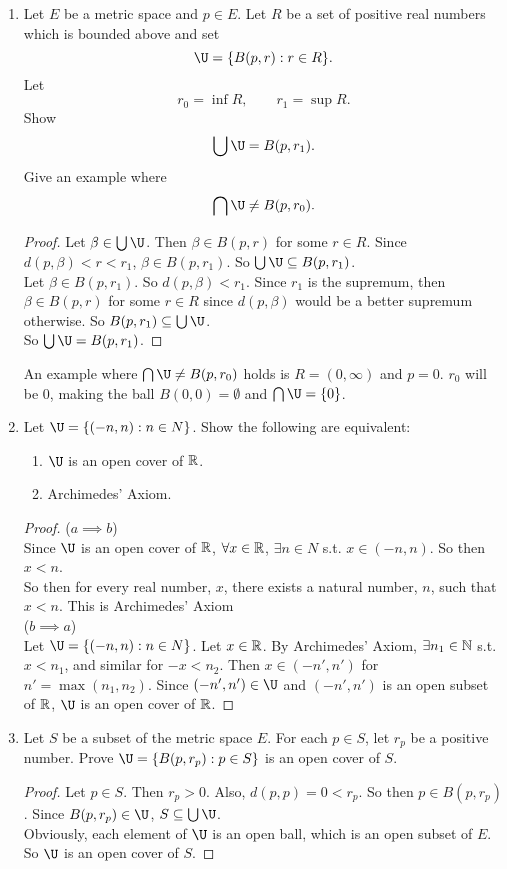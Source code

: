 \documentclass[14pt]{extarticle}
\begin{document}
\begin{enumerate}
		\item Let $E$ be a metric space and $p \in E$. Let $R$ be a set of positive real numbers which is bounded above and set $$\U = \{B(p, r) : r \in R\}.$$
		Let $$r_0 = \inf R, \qquad r_1 = \sup R.$$
		Show $$\bigcup \U = B(p,r_1).$$
		Give an example where $$\bigcap \U \neq B(p,r_0).$$
		\begin{proof}
			Let $\beta \in \bigcup\U$. Then $\beta \in B(p,r)$ for some $r\in R$. Since $d(p,\beta) < r < r_1$, $\beta \in B(p,r_1)$. So $\bigcup\U \subseteq B(p,r_1)$.\\
			Let $\beta \in B(p,r_1)$. So $d(p,\beta) < r_1$. Since $r_1$ is the supremum, then $\beta \in B(p,r)$ for some $r \in R$ since $d(p,\beta)$ would be a better supremum otherwise.
			So $B(p,r_1) \subseteq \bigcup\U$.\\
			So $\bigcup\U = B(p,r_1)$.
		\end{proof}
		An example where $\bigcap \U \neq B(p,r_0)$ holds is $R = (0,\infty)$ and $p=0$. $r_0$ will be $0$, making the ball $B(0,0) = \emptyset$ and $\bigcap \U = \{0\}$.
		
		\item Let $\U = \{(-n, n) : n \in N\}$. Show the following are equivalent:
		\begin{enumerate}
			\item $\U$ is an open cover of $\mathbb{R}$.
			\item Archimedes' Axiom.
		\end{enumerate}
		\begin{proof}
			($a \implies b$)\\
			Since $\U$ is an open cover of $\mathbb{R}$, $\forall x\in\mathbb{R}$, $\exists n\in N$ s.t. $x\in(-n,n)$. So then $x < n$.\\
			So then for every real number, $x$, there exists a natural number, $n$, such that $x<n$. This is Archimedes' Axiom\\
			($b \implies a$)\\
			Let $\U = \{(-n, n) : n \in N\}$. Let $x \in \mathbb{R}$. By Archimedes' Axiom, $\exists n_1\in\mathbb{N}$ s.t. $x<n_1$, and similar for $-x < n_2$. Then $x\in(-n',n')$ for $n'=\max(n_1,n_2)$. Since $(-n',n') \in \U$ and $(-n',n')$ is an open subset of $\mathbb{R}$, $\U$ is an open cover of $\mathbb{R}$.
		\end{proof}
	
		\item Let $S$ be a subset of the metric space $E$. For each $p \in S$, let $r_p $ be a positive number. Prove $\U = \{B(p, r_p) : p \in S\}$ is an open cover of $S$.
		\begin{proof}
			Let $p \in S$. Then $r_p > 0$. Also, $d(p,p) = 0 < r_p$. So then $p \in B(p,r_p)$. Since $B(p,r_p) \in \U$, $S \subseteq \bigcup\U$.\\
			Obviously, each element of $\U$ is an open ball, which is an open subset of $E$.\\
			So $\U$ is an open cover of $S$.
		\end{proof}
	

\end{enumerate}
\end{document}
